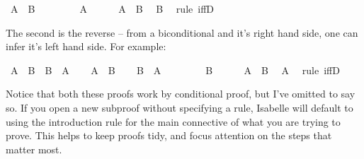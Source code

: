 \begin{isabellebody}
\ {\isachardoublequoteopen}A\ {\isasymlongrightarrow}\ B{\isachardoublequoteclose}\isanewline
\ \ \isamarkupfalse%
\isanewline
\ \ \ \ \isamarkupfalse%
\ {\isachardoublequoteopen}A{\isachardoublequoteclose}\isanewline
\ \ \ \ \isamarkupfalse%
\ {\isacharbackquoteopen}A\ {\isasymlongleftrightarrow}\ B{\isacharbackquoteclose}\ \isamarkupfalse%
\ {\isachardoublequoteopen}B{\isachardoublequoteclose}\ \isamarkupfalse%
\ {\isacharparenleft}rule\ iffD{}{\isacharparenright}\isanewline
\ \ \isamarkupfalse%
\isanewline
{}\isamarkupfalse%
%
\endisatagproof
{\isafoldproof}%
%
\isadelimproof
%
\endisadelimproof
%
\begin{isamarkuptext}%
The second is the reverse -- from a biconditional and it's right hand side, one can infer
it's left hand side. For example:%
\end{isamarkuptext}\isamarkuptrue%
\isamarkupfalse%
\ {\isachardoublequoteopen}{\isacharparenleft}A\ {\isasymlongleftrightarrow}\ B{\isacharparenright}\ {\isasymlongrightarrow}\ B\ {\isasymlongrightarrow}\ A{\isachardoublequoteclose}\isanewline
%
\isadelimproof
%
\endisadelimproof
%
\isatagproof
{}\isamarkupfalse%
\isanewline
\ \ \isamarkupfalse%
\ {\isachardoublequoteopen}A\ {\isasymlongleftrightarrow}\ B{\isachardoublequoteclose}\isanewline
\ \ \isamarkupfalse%
\ {\isachardoublequoteopen}B\ {\isasymlongrightarrow}\ A{\isachardoublequoteclose}\isanewline
\ \ \isamarkupfalse%
\isanewline
\ \ \ \ \isamarkupfalse%
\ {\isachardoublequoteopen}B{\isachardoublequoteclose}\isanewline
\ \ \ \ \isamarkupfalse%
\ {\isacharbackquoteopen}A\ {\isasymlongleftrightarrow}\ B{\isacharbackquoteclose}\ \isamarkupfalse%
\ {\isachardoublequoteopen}A{\isachardoublequoteclose}\ \isamarkupfalse%
\ {\isacharparenleft}rule\ iffD{}{\isacharparenright}\isanewline
\ \ \isamarkupfalse%
\isanewline
{}\isamarkupfalse%
%
\endisatagproof
{\isafoldproof}%
%
\isadelimproof
%
\endisadelimproof
%
\begin{isamarkuptext}%
Notice that both these proofs work by conditional proof, but I've omitted to say so. If you
open a new subproof without specifying a rule, Isabelle will default to using the introduction rule
for the main connective of what you are trying to prove. This helps to keep proofs tidy, and focus
attention on the steps that matter most.%

\end{isamarkuptext}
\end{isabellebody}

